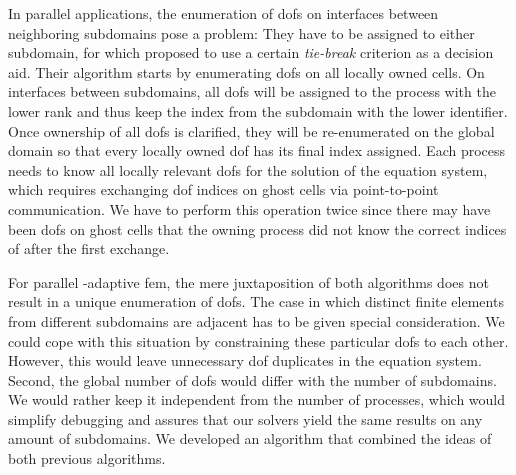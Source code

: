 



In parallel applications, the enumeration of \glspl{dof} on interfaces between neighboring subdomains pose a problem: They have to be assigned to either subdomain, for which \textcite[Sec.~3.1]{bangerth2012} proposed to use a certain \textit{tie-break} criterion as a decision aid. Their algorithm starts by enumerating \glspl{dof} on all locally owned cells. On interfaces between subdomains, all \glspl{dof} will be assigned to the process with the lower rank and thus keep the index from the subdomain with the lower identifier. Once ownership of all \glspl{dof} is clarified, they will be re-enumerated on the global domain so that every locally owned \gls{dof} has its final index assigned. Each process needs to know all locally relevant \glspl{dof} for the solution of the equation system, which requires exchanging \gls{dof} indices on ghost cells via point-to-point communication. We have to perform this operation twice since there may have been \glspl{dof} on ghost cells that the owning process did not know the correct indices of after the first exchange.


For parallel \hp-adaptive \gls{fem}, the mere juxtaposition of both algorithms does not result in a unique enumeration of \glspl{dof}. The case in which distinct finite elements from different subdomains are adjacent has to be given special consideration. We could cope with this situation by constraining these particular \glspl{dof} to each other. However, this would leave unnecessary \gls{dof} duplicates in the equation system. Second, the global number of \glspl{dof} would differ with the number of subdomains. We would rather keep it independent from the number of processes, which would simplify debugging and assures that our solvers yield the same results on any amount of subdomains. We developed an algorithm that combined the ideas of both previous algorithms.

